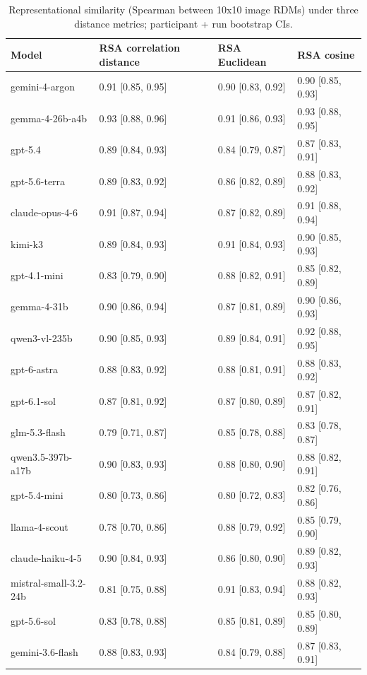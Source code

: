\begin{table}
\caption{Representational similarity (Spearman between 10x10 image RDMs) under three distance metrics; participant + run bootstrap CIs.}
\begin{tabular}{llll}
\toprule
Model & RSA correlation distance & RSA Euclidean & RSA cosine \\
\midrule
gemini-4-argon & 0.91 [0.85, 0.95] & 0.90 [0.83, 0.92] & 0.90 [0.85, 0.93] \\
gemma-4-26b-a4b & 0.93 [0.88, 0.96] & 0.91 [0.86, 0.93] & 0.93 [0.88, 0.95] \\
gpt-5.4 & 0.89 [0.84, 0.93] & 0.84 [0.79, 0.87] & 0.87 [0.83, 0.91] \\
gpt-5.6-terra & 0.89 [0.83, 0.92] & 0.86 [0.82, 0.89] & 0.88 [0.83, 0.92] \\
claude-opus-4-6 & 0.91 [0.87, 0.94] & 0.87 [0.82, 0.89] & 0.91 [0.88, 0.94] \\
kimi-k3 & 0.89 [0.84, 0.93] & 0.91 [0.84, 0.93] & 0.90 [0.85, 0.93] \\
gpt-4.1-mini & 0.83 [0.79, 0.90] & 0.88 [0.82, 0.91] & 0.85 [0.82, 0.89] \\
gemma-4-31b & 0.90 [0.86, 0.94] & 0.87 [0.81, 0.89] & 0.90 [0.86, 0.93] \\
qwen3-vl-235b & 0.90 [0.85, 0.93] & 0.89 [0.84, 0.91] & 0.92 [0.88, 0.95] \\
gpt-6-astra & 0.88 [0.83, 0.92] & 0.88 [0.81, 0.91] & 0.88 [0.83, 0.92] \\
gpt-6.1-sol & 0.87 [0.81, 0.92] & 0.87 [0.80, 0.89] & 0.87 [0.82, 0.91] \\
glm-5.3-flash & 0.79 [0.71, 0.87] & 0.85 [0.78, 0.88] & 0.83 [0.78, 0.87] \\
qwen3.5-397b-a17b & 0.90 [0.83, 0.93] & 0.88 [0.80, 0.90] & 0.88 [0.82, 0.91] \\
gpt-5.4-mini & 0.80 [0.73, 0.86] & 0.80 [0.72, 0.83] & 0.82 [0.76, 0.86] \\
llama-4-scout & 0.78 [0.70, 0.86] & 0.88 [0.79, 0.92] & 0.85 [0.79, 0.90] \\
claude-haiku-4-5 & 0.90 [0.84, 0.93] & 0.86 [0.80, 0.90] & 0.89 [0.82, 0.93] \\
mistral-small-3.2-24b & 0.81 [0.75, 0.88] & 0.91 [0.83, 0.94] & 0.88 [0.82, 0.93] \\
gpt-5.6-sol & 0.83 [0.78, 0.88] & 0.85 [0.81, 0.89] & 0.85 [0.80, 0.89] \\
gemini-3.6-flash & 0.88 [0.83, 0.93] & 0.84 [0.79, 0.88] & 0.87 [0.83, 0.91] \\

\end{tabular}
\end{table}
